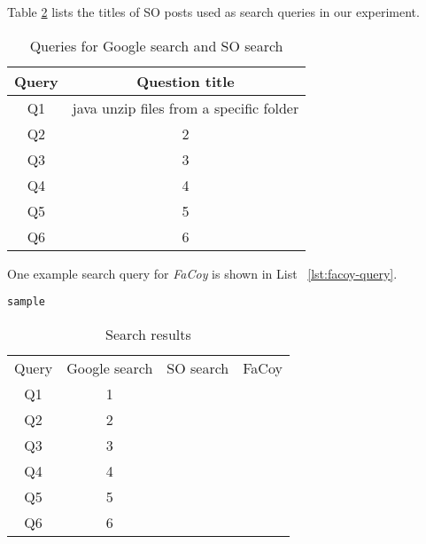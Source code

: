 Table \ref{tab:so-questions} lists the titles of SO posts used as search queries in our experiment.

\begin{table}
	\begin{center}
		\begin{tabular}{ c|c } 
			Query & Question title \\\hline 
			Q1 &  java unzip files from a specific folder\\\hline 
			Q2 &  2 \\ \hline
			Q3 &  3 \\ \hline
			Q4 &  4 \\ \hline
			Q5 &  5 \\ \hline
			Q6 &  6 \\ \hline
		\end{tabular}		
	\end{center}
	\caption{Queries for Google search and SO search}
	\label{tab:so-questions}
\end{table}

One example search query for \textit{FaCoy} is shown in List ~\ref{lst:facoy-query}.
\begin{lstlisting}[label={lst:facoy-query}]
	sample
\end{lstlisting}

\begin{table}
	\begin{center}
		\begin{tabular}{ c|c|c|c } 
			Query & Google search & SO search & FaCoy \\ 
			Q1 &  1  & &\\\hline 
			Q2 &  2 & &\\ \hline
			Q3 &  3 & &\\ \hline
			Q4 &  4 & &\\ \hline
			Q5 &  5 & & \\ \hline
			Q6 &  6 & &\\ \hline
		\end{tabular}		
	\end{center}
	\caption{Search results}
	\label{tab:so-questions}
\end{table}
